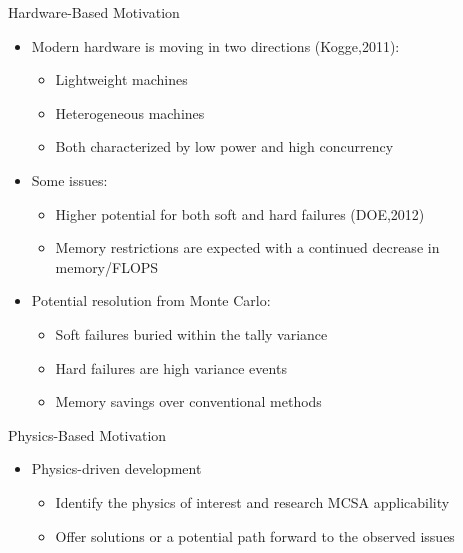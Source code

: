 \documentclass{beamer}
\begin{document}
\begin{frame}{Hardware-Based Motivation}

  \begin{itemize}
  \item Modern hardware is moving in two directions (Kogge,2011):
    \begin{itemize}
    \item Lightweight machines
    \item Heterogeneous machines
    \item Both characterized by low power and high concurrency
    \end{itemize}
    \medskip \medskip
  \item Some issues:
    \begin{itemize}
    \item Higher potential for both soft and hard failures (DOE,2012)
    \item Memory restrictions are expected with a continued decrease
      in memory/FLOPS
    \end{itemize}
    \medskip \medskip
  \item Potential resolution from Monte Carlo:
    \begin{itemize}
    \item Soft failures buried within the tally variance
    \item Hard failures are high variance events
    \item Memory savings over conventional methods
    \end{itemize}
  \end{itemize}

\end{frame}

\begin{frame}{Physics-Based Motivation}

  \begin{itemize}
  \item Physics-driven development
    \begin{itemize}
    \item Identify the physics of interest and research MCSA
      applicability
    \item Offer solutions or a potential path forward to the observed
      issues
    \end{itemize}
  \end{itemize}

\end{frame}
\end{document}
